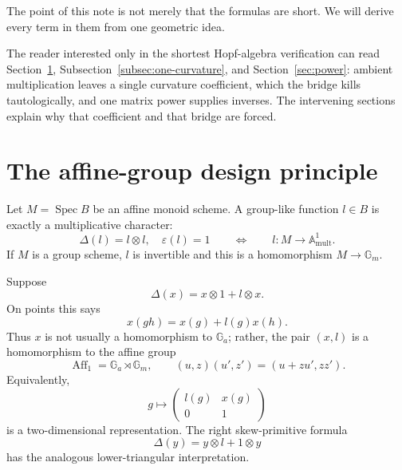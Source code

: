 \documentclass[11pt]{amsart}
\theoremstyle{definition}
\theoremstyle{remark}
\newcommand{\Ga}{\mathbb G_a}
\newcommand{\Gm}{\mathbb G_m}
\newcommand{\Spec}{\operatorname{Spec}}
\newcommand{\eps}{\varepsilon}
\newcommand{\ot}{\otimes}
\begin{document}
The point of this note is not merely that the formulas are short.  We will
derive every term in them from one geometric idea.

The reader interested only in the shortest Hopf-algebra verification can
read Section~\ref{sec:design}, Subsection~\ref{subsec:one-curvature}, and
Section~\ref{sec:power}: ambient multiplication leaves a single curvature
coefficient, which the bridge kills tautologically, and one matrix power
supplies inverses.
The intervening sections explain why that coefficient and that bridge are
forced.

\section{The affine-group design principle}
\label{sec:design}

Let \(M=\Spec B\) be an affine monoid scheme.  A group-like function
\(l\in B\) is exactly a multiplicative character:
\[
 \Delta(l)=l\ot l,\quad\eps(l)=1
 \qquad\Longleftrightarrow\qquad
 l\colon M\longrightarrow\mathbb A^1_{\mathrm{mult}}.
\]
If \(M\) is a group scheme, \(l\) is invertible and this is a homomorphism
\(M\to\Gm\).

Suppose
\[
 \Delta(x)=x\ot1+l\ot x.
\]
On points this says
\[
 x(gh)=x(g)+l(g)x(h).
\]
Thus \(x\) is not usually a homomorphism to \(\Ga\); rather, the pair
\((x,l)\) is a homomorphism to the affine group
\[
 \operatorname{Aff}_1=\Ga\rtimes\Gm,\qquad
 (u,z)(u',z')=(u+zu',zz').
\]
Equivalently,
\[
 g\longmapsto
 \begin{pmatrix}l(g)&x(g)\\0&1\end{pmatrix}
\]
is a two-dimensional representation.  The right skew-primitive formula
\[
 \Delta(y)=y\ot l+1\ot y
\]
has the analogous lower-triangular interpretation.
\end{document}
